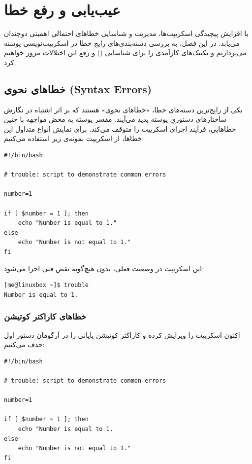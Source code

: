 \chapter{عیب‌یابی و رفع خطا}

با افزایش پیچیدگی اسکریپت‌ها، مدیریت و شناسایی خطاهای احتمالی اهمیتی دوچندان می‌یابد. در این فصل، به بررسی دسته‌بندی‌های رایج خطا در اسکریپت‌نویسی پوسته می‌پردازیم و تکنیک‌های کارآمدی را برای شناسایی () و رفع این اختلالات مرور خواهیم کرد.

\section{خطاهای نحوی (Syntax Errors)}

یکی از رایج‌ترین دسته‌های خطا، «خطاهای نحوی» هستند که بر اثر اشتباه در نگارش ساختارهای دستوریِ پوسته پدید می‌آیند. مفسر پوسته به محض مواجهه با چنین خطاهایی، فرآیند اجرای اسکریپت را متوقف می‌کند. برای نمایش انواع متداول این خطاها، از اسکریپت نمونه‌ی زیر استفاده می‌کنیم:

\begin{latin}
\begin{lstlisting}
#!/bin/bash

# trouble: script to demonstrate common errors

number=1

if [ $number = 1 ]; then
    echo "Number is equal to 1."
else
    echo "Number is not equal to 1."
fi
\end{lstlisting}
\end{latin}

این اسکریپت در وضعیت فعلی، بدون هیچ‌گونه نقص فنی اجرا می‌شود:

\begin{latin}
\begin{lstlisting}
[me@linuxbox ~]$ trouble
Number is equal to 1.
\end{lstlisting}
\end{latin}

\subsection{خطاهای کاراکتر کوتیشن}

اکنون اسکریپت را ویرایش کرده و کاراکتر کوتیشن پایانی را در آرگومان دستور  اول حذف می‌کنیم:

\begin{latin}
\begin{lstlisting}
#!/bin/bash

# trouble: script to demonstrate common errors

number=1

if [ $number = 1 ]; then
    echo "Number is equal to 1.
else
    echo "Number is not equal to 1."
fi
\end{lstlisting}
\end{latin}

